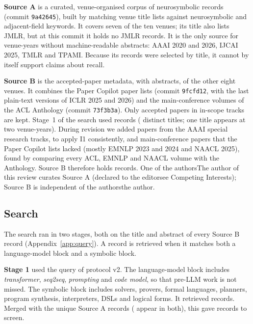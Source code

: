 \textbf{Source A} is a curated, venue-organised corpus of  neurosymbolic records~\corpuscite{} (commit \texttt{9a42645}), built by matching venue title lists against neurosymbolic and adjacent-field keywords. It covers seven of the ten venues; its title also lists JMLR, but at this commit it holds no JMLR records. It is the only source for venue-years without machine-readable abstracts: AAAI 2020 and 2026, IJCAI 2025, TMLR and TPAMI. Because its records were selected by title, it cannot by itself support claims about recall.

\textbf{Source B} is the accepted-paper metadata, with abstracts, of the other eight venues. It combines the Paper Copilot paper lists (commit \texttt{9fcfd12}, with the last plain-text versions of ICLR 2025 and 2026) and the main-conference volumes of the ACL Anthology (commit \texttt{73f3b3a}). Only accepted papers in in-scope tracks are kept. Stage~1 of the search used  records ( distinct titles; one title appears at two venue-years). During revision we added  papers from the AAAI special research tracks, to apply I1 consistently, and  main-conference papers that the Paper Copilot lists lacked (mostly EMNLP 2023 and 2024 and NAACL 2025), found by comparing every ACL, EMNLP and NAACL volume with the Anthology. Source B therefore holds  records. \ifanonymous One of the authors\else The author of this review\fi{} curates Source A (\ifanonymous declared to the editor\else see Competing Interests\fi); Source B is independent of \ifanonymous the authors\else the author\fi.

\begin{table}[t]
\centering
\caption{Information sources and coverage. ``Source A only'' marks venue-years searched through the curated corpus alone. Source B records include the revision-2 additions.}
\label{tab:sources}
\footnotesize
\setlength{\tabcolsep}{3.5pt}

\end{table}

\subsection{Search}
\label{sec:method-search}
The search ran in two stages, both on the title and abstract of every Source B record (Appendix~\ref{app:query}). A record is retrieved when it matches both a language-model block and a symbolic block.

\textbf{Stage 1} used the query of protocol v2. The language-model block includes \emph{transformer}, \emph{seq2seq}, \emph{prompting} and \emph{code model}, so that pre-LLM work is not missed. The symbolic block includes solvers, provers, formal languages, planners, program synthesis, interpreters, DSLs and logical forms. It retrieved  records. Merged with the  unique Source A records ( appear in both), this gave  records to screen.

